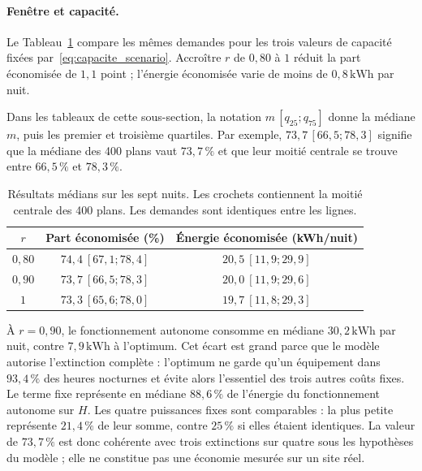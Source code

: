 \paragraph{Fenêtre et capacité.}
Le Tableau~\ref{tab:plan_quatre_r} compare les mêmes demandes pour les trois
valeurs de capacité fixées par~\eqref{eq:capacite_scenario}. Accroître \(r\)
de \(0{,}80\) à \(1\) réduit la part économisée de \(1{,}1\) point ; l'énergie
économisée varie de moins de \(0{,}8\,\mathrm{kWh}\) par nuit.

Dans les tableaux de cette sous-section, la notation
\(m\,[q_{25};q_{75}]\) donne la médiane \(m\), puis les premier et troisième
quartiles. Par exemple, \(73{,}7\,[66{,}5;78{,}3]\) signifie que la médiane
des 400 plans vaut \(73{,}7\,\%\) et que leur moitié centrale se trouve
entre \(66{,}5\,\%\) et \(78{,}3\,\%\).

\begin{table}[htbp]
\centering
\small
\setlength{\tabcolsep}{4pt}
\begin{tabular}{ccc}
\hline
\(r\) & Part économisée (\%) & Énergie économisée (kWh/nuit) \\
\hline
\(0{,}80\) & \(74{,}4\ [67{,}1;78{,}4]\) & \(20{,}5\ [11{,}9;29{,}9]\) \\
\(0{,}90\) & \(73{,}7\ [66{,}5;78{,}3]\) & \(20{,}0\ [11{,}9;29{,}6]\) \\
\(1\)      & \(73{,}3\ [65{,}6;78{,}0]\) & \(19{,}7\ [11{,}8;29{,}3]\) \\
\hline
\end{tabular}
\caption{Résultats médians sur les sept nuits. Les crochets contiennent la
moitié centrale des 400 plans. Les demandes sont identiques entre les
lignes.}
\label{tab:plan_quatre_r}
\end{table}

À \(r=0{,}90\), le fonctionnement autonome consomme en médiane
\(30{,}2\,\mathrm{kWh}\) par nuit, contre \(7{,}9\,\mathrm{kWh}\) à
l'optimum. Cet écart est grand parce que le modèle autorise l'extinction
complète : l'optimum ne garde qu'un équipement dans \(93{,}4\,\%\) des heures
nocturnes et évite alors l'essentiel des trois autres coûts fixes. Le terme
fixe représente en médiane \(88{,}6\,\%\) de l'énergie du fonctionnement
autonome sur \(H\). Les quatre puissances fixes sont comparables : la plus
petite représente \(21{,}4\,\%\) de leur somme, contre \(25\,\%\) si elles
étaient identiques. La valeur de \(73{,}7\,\%\) est donc cohérente avec trois
extinctions sur quatre sous les hypothèses du modèle ; elle ne constitue pas
une économie mesurée sur un site réel.

